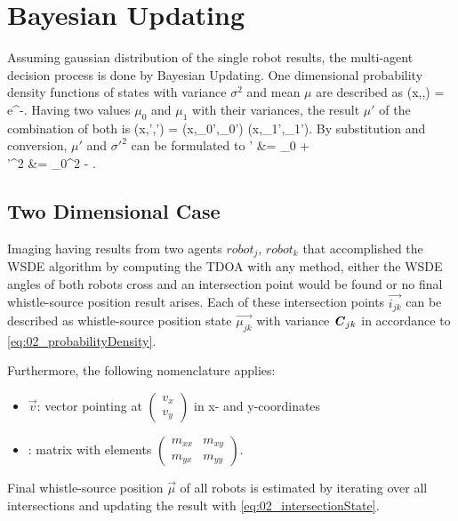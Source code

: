 \section{Bayesian Updating}
\label{sec:02_filter}

Assuming gaussian distribution of the single robot results,
the multi-agent decision process is done by Bayesian Updating.
One dimensional probability density functions of states with
variance $\sigma^2$ and mean $\mu$ are described as
\bal
    (x,\sigma,\mu) = e^{-}.
    \label{eq:02_probabilityDensity}
\eal
Having two values $\mu_0$ and $\mu_1$ with their variances,
the result $\mu'$ of the combination of both is
\bal
    (x,\sigma',\mu') = (x,\sigma_0',\mu_0') \cdot {}(x,\sigma_1',\mu_1').
    \label{eq:02_newProbabilityDensity}
\eal
By substitution and conversion, $\mu'$ and $\sigma'^2$ can be
formulated to
\bsub
\label{eq:02_intersectionState}
\bal
    \mu' &= \mu_0 + \\
    \sigma'^2 &= \sigma_0^2 - .
\eal
\esub

\subsection{Two Dimensional Case}
\label{subsec:02_2dTeam}

Imaging having results from two agents $robot_j$, $robot_k$ that accomplished the \ac{WSDE} algorithm by
computing the \ac{TDOA} with any method, either the \ac{WSDE} angles of both robots
cross and an intersection point would be found or no final whistle-source position result arises.
Each of these intersection points $\vec{i_{jk}}$ can be described as whistle-source position
state $\vec{\mu_{jk}}$ with variance $\textbf{\textit{C}}_{jk}$ in accordance to \cref{eq:02_probabilityDensity}.

Furthermore, the following nomenclature applies:
\begin{itemize}
\item $\vec{v}$: vector pointing at $\left( \begin{matrix} v_x \\ v_y \end{matrix} \right)$ in
      x- and y-coordinates
\item {}: matrix with elements $\left( \begin{matrix} m_{xx} & m_{xy} \\ m_{yx} & m_{yy} \end{matrix} \right)$.
\end{itemize}
Final whistle-source position $\vec{\mu}$ of all robots is estimated by iterating over
all intersections and updating the result with \cref{eq:02_intersectionState}.

